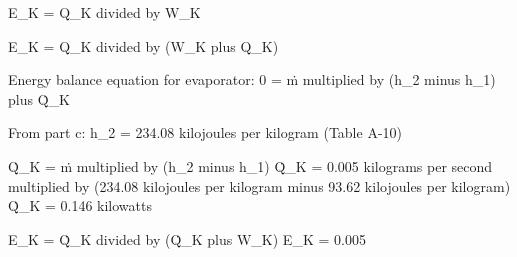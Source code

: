 E_K = Q_K divided by W_K  

E_K = Q_K divided by (W_K plus Q_K)  

Energy balance equation for evaporator:  
0 = ṁ multiplied by (h_2 minus h_1) plus Q̇_K  

From part c:  
h_2 = 234.08 kilojoules per kilogram (Table A-10)  

Q̇_K = ṁ multiplied by (h_2 minus h_1)  
Q̇_K = 0.005 kilograms per second multiplied by (234.08 kilojoules per kilogram minus 93.62 kilojoules per kilogram)  
Q̇_K = 0.146 kilowatts  

E_K = Q̇_K divided by (Q̇_K plus W_K)  
E_K = 0.005